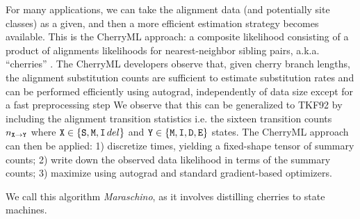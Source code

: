 For many applications, we can take the alignment data (and potentially site classes) as a given,
and then a more efficient estimation strategy becomes available.
This is the CherryML approach:
a composite likelihood consisting of a product of alignments likelihoods for nearest-neighbor sibling pairs,
a.k.a. ``cherries'' \cite{Prillo2022CherryML}.
The CherryML developers observe that, given cherry branch lengths, the alignment substitution counts are sufficient to estimate substitution rates
and can be performed efficiently using autograd, independently of data size except for a fast preprocessing step
We observe that this can be generalized to TKF92 by including the alignment transition statistics
i.e. the sixteen transition counts $n_{{\tt X}\to{\tt Y}}$ where ${\tt X}\in\{{\tt S},{\tt M},{\tt I}\,del\}$ and ${\tt Y}\in\{{\tt M},{\tt I},{\tt D},{\tt E}\}$ states.
The CherryML approach can then be applied: 1) discretize times, yielding a fixed-shape tensor of summary counts;
2) write down the observed data likelihood in terms of the summary counts; 3) maximize using autograd and standard
gradient-based optimizers.

We call this algorithm {\em Maraschino}, as it involves distilling cherries to state machines.
